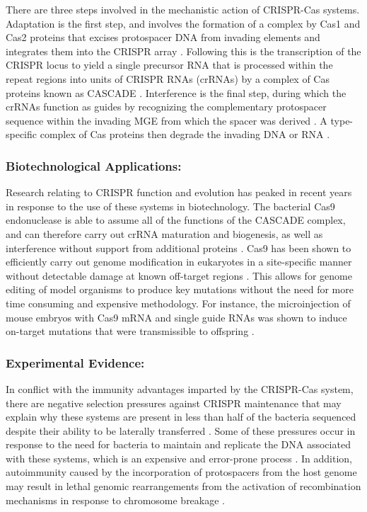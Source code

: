 \documentclass[english]{article}
\begin{document}
There are three steps involved in the mechanistic action of CRISPR-Cas
systems. Adaptation is the first step, and
involves the formation of a complex by Cas1 and Cas2 proteins that
excises protospacer DNA from invading elements and integrates them
into the CRISPR array \citep{Koon:13}. Following this is the transcription of the
CRISPR locus to yield a single precursor RNA that is processed within
the repeat regions into units of CRISPR RNAs (crRNAs) by a complex of
Cas proteins known as CASCADE \citep{Koon:13}. Interference is the
final step, during which the crRNAs function as guides by recognizing the complementary
protospacer sequence within the invading MGE from which the spacer was
derived \citep{Koon:13}. A type-specific complex of Cas proteins then degrade the
invading DNA or RNA \citep{Koon:13}.

\subsubsection{Biotechnological Applications:}

Research relating to CRISPR function and evolution has peaked in
recent years in response to the use of these systems in biotechnology.
The bacterial Cas9 endonuclease is able to assume all of the functions
of the CASCADE complex, and can therefore carry out crRNA maturation
and biogenesis, as well as interference without support from
additional proteins \citep{Shen:14}. Cas9 has been shown to efficiently carry out
genome modification in eukaryotes in a site-specific manner without
detectable damage at known off-target regions \citep{Shen:14}. This allows for genome
editing of model organisms to produce key mutations without the need
for more time consuming and expensive methodology. For instance, the
microinjection of mouse embryos with Cas9 mRNA and single guide RNAs
was shown to induce on-target mutations that were transmissible to
offspring \citep{Shen:14}. 

\subsubsection{Experimental Evidence:}

In conflict with the immunity advantages imparted by the CRISPR-Cas
system, there are negative selection pressures against CRISPR
maintenance that may explain why these systems are present in less
than half of the bacteria sequenced despite their ability to be
laterally transferred \citep{Bond:14}. Some of these pressures
occur in response to the need for bacteria to maintain and replicate
the DNA associated with these systems, which is an expensive and
error-prone process \citep{Jian:13}. In addition, autoimmunity caused by the
incorporation of protospacers from the host genome may result in lethal
genomic rearrangements from the activation of recombination mechanisms in response
to chromosome breakage \citep{Jian:13}. 
\end{document}
